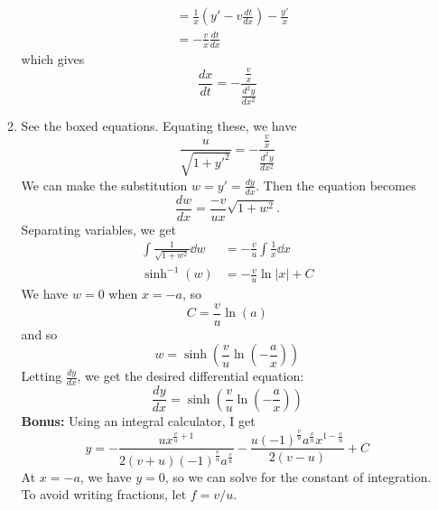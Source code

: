 \documentclass{article}
\begin{document}
\begin{enumerate}
\begin{enumerate}
\begin{align}
            &= \frac{1}{x}\left(y'-v\frac{dt}{dx}\right) - \frac{y'}{x} \\ 
            &= -\frac{v}{x}\frac{dt}{dx}
        \end{align}
        which gives 
        \begin{equation}
            \boxed{\frac{dx}{dt} = -\frac{\frac{v}{x}}{\frac{d^2y}{dx^2}}}
        \end{equation}
        \item See the boxed equations. Equating these, we have 
        \begin{equation}
            \frac{u}{\sqrt{1+y'^2}}=-\frac{\frac{v}{x}}{\frac{d^2y}{dx^2}}
        \end{equation}
        We can make the substitution $w = y' = \frac{dy}{dx}$. Then the equation becomes 
        \begin{equation}
            \frac{dw}{dx} = \frac{-v}{ux}\sqrt{1+w^2}.
        \end{equation}
        Separating variables, we get 
        \begin{align}
            \int \frac{1}{\sqrt{1+w^2}}\dd{w} &= -\frac{v}{u} \int \frac{1}{x} \dd{x}  \\ 
            \sinh^{-1}(w) &= - \frac{v}{u}\ln|x| + C 
        \end{align}
        We have $w=0$ when $x=-a$, so 
        \begin{equation}
            C = \frac{v}{u}\ln(a)
        \end{equation}
        and so 
        \begin{equation}
            w = \sinh\left(\frac{v}{u}\ln\left(-\frac{a}{x}\right)\right)
        \end{equation}
        Letting $\frac{dy}{dx}$, we get the desired differential equation: 
        \begin{equation}
            \frac{dy}{dx} = \sinh\left(\frac{v}{u}\ln\left(-\frac{a}{x}\right)\right)
        \end{equation}
        \textbf{Bonus:} Using an integral calculator, I get 
        \begin{equation}
            y = -\dfrac{ux^{\frac{v}{u}+1}}{2\left(v+u\right)\left(-1\right)^\frac{v}{u}a^\frac{v}{u}}-\dfrac{u\left(-1\right)^\frac{v}{u}a^\frac{v}{u}x^{1-\frac{v}{u}}}{2\left(v-u\right)} + C
        \end{equation}
        At $x=-a$, we have $y=0$, so we can solve for the constant of integration. To avoid writing fractions, let $f=v/u$. 
        \begin{align}

\end{align}
\end{enumerate}
\end{enumerate}
\end{document}
